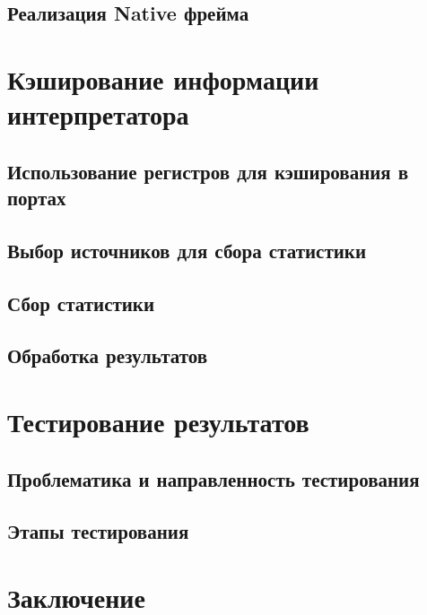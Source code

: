 \documentclass[14pt]{spbau-diploma}
\begin{document}
\subsection{Реализация Native фрейма}

\section{Кэширование информации интерпретатора}
\subsection{Использование регистров для кэширования в портах}
\subsection{Выбор источников для сбора статистики}
\subsection{Сбор статистики}
\subsection{Обработка результатов}

\section{Тестирование результатов}  
\subsection{Проблематика и направленность тестирования}
\subsection{Этапы тестирования}


\section*{Заключение}




\end{document}
